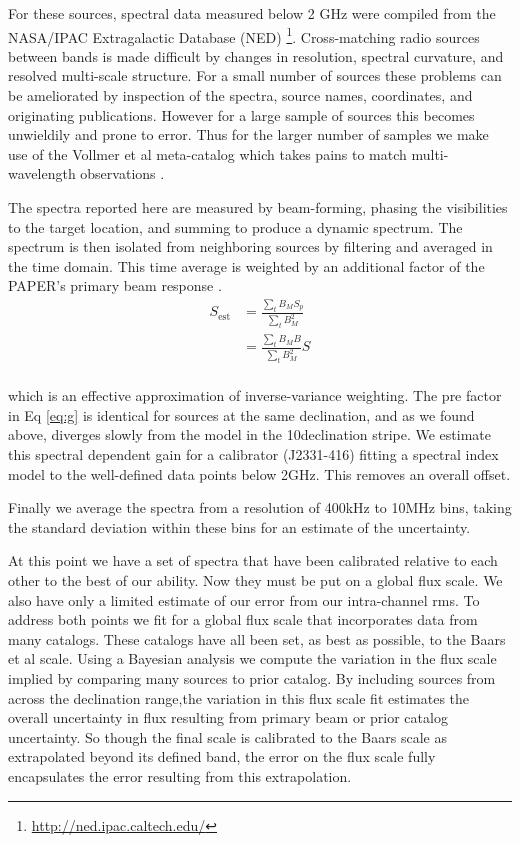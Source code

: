 \documentclass[preprint]{aastex}
\begin{document}
For these sources, spectral data measured below 2 GHz were compiled from 
the NASA/IPAC Extragalactic Database (NED)
\footnote{\url{http://ned.ipac.caltech.edu/}}. Cross-matching radio sources
between bands is made difficult by changes in resolution, spectral curvature,
and resolved multi-scale structure.  For a small number of sources these
problems can be ameliorated by inspection of the spectra, source names,
coordinates,  and originating publications. However for a large sample of
sources this becomes unwieldily and prone to error. Thus for the larger number
of samples we make use of the Vollmer et al meta-catalog which takes pains to
match multi-wavelength observations \citep{Vollmer:2010p6422}.

The spectra reported here are measured by beam-forming, phasing the visibilities to
the target location, and summing to produce a dynamic spectrum. The spectrum is then isolated
from neighboring sources by filtering and averaged in the time domain.  This time average is 
weighted by an additional factor of the PAPER's primary beam response 
\citep{pober_et_al2012}.  
\begin{align}
S_\textrm{est} &= \frac{\sum_t B_M S_p}{\sum_t B^2_M}\\
&= \frac{\sum_t B_M B}{\sum_t B^2_M} S\\ \label{eq:g}
\end{align}

which is an effective approximation of inverse-variance weighting. The pre factor in Eq \ref{eq:g} is identical for 
sources at the same declination, and as we found above, diverges slowly from the model in the 10\arcdeg declination stripe.
We estimate this spectral dependent gain for a calibrator (J2331-416) fitting a spectral index model to the
 well-defined data points below 2GHz. This removes an overall offset.
 
 Finally we average the spectra from a resolution of 400kHz to 10MHz bins, taking the standard deviation within these bins
 for an estimate of the uncertainty.

At this point we have a set of spectra that have been calibrated relative to each other to the best of our ability. Now 
they must be put on a global flux scale. We also have only a limited estimate of our error from our intra-channel
rms.  To address both points we fit for a global flux scale that incorporates data from many catalogs. These catalogs
have all been set, as best as possible, to the Baars et al scale.  Using a Bayesian analysis we compute the 
variation in the flux scale implied by comparing many sources to prior catalog. By including sources from across
the declination range,the variation in this flux scale fit estimates the overall uncertainty in flux resulting from primary beam 
or prior catalog uncertainty.  So though the final scale is calibrated to the Baars scale as extrapolated beyond its
defined band, the error on the flux scale fully encapsulates the error resulting from this extrapolation.
\end{document}
